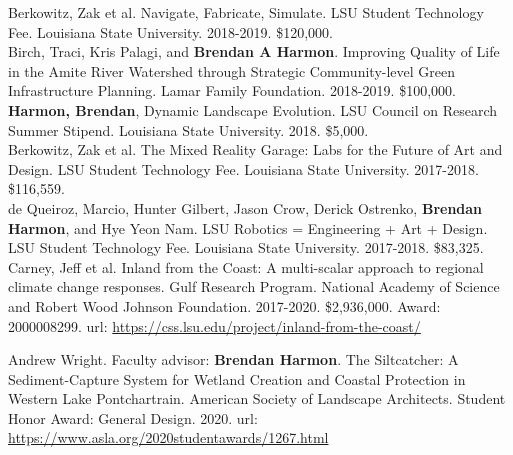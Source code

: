 \documentclass[10pt]{developercv} %
\begin{document}
Berkowitz, Zak et al. Navigate, Fabricate, Simulate. 
LSU Student Technology Fee. Louisiana State University. 
2018-2019.	\$120,000.\\

Birch, Traci, Kris Palagi, and \textbf{Brendan A Harmon}. 
Improving Quality of Life in the Amite River Watershed through Strategic Community-level Green Infrastructure Planning. 
Lamar Family Foundation. 
2018-2019. \$100,000.\\

\textbf{Harmon, Brendan}, 
Dynamic Landscape Evolution. 
LSU Council on Research Summer Stipend. Louisiana State University. 
2018. \$5,000.\\

Berkowitz, Zak et al. 
The Mixed Reality Garage: Labs for the Future of Art and Design. 
LSU Student Technology Fee. Louisiana State University. 
2017-2018. \$116,559.\\

de Queiroz, Marcio, Hunter Gilbert, Jason Crow, Derick Ostrenko, \textbf{Brendan Harmon}, and Hye Yeon Nam. 
LSU Robotics = Engineering + Art + Design. 
LSU Student Technology Fee. Louisiana State University. 
2017-2018. \$83,325.\\

Carney, Jeff et al. 
Inland from the Coast: A multi-scalar approach to regional climate change responses. 
Gulf Research Program. National Academy of Science and Robert Wood Johnson Foundation.
2017-2020. \$2,936,000. Award: 2000008299.
url: \url{https://css.lsu.edu/project/inland-from-the-coast/}\\






Andrew Wright. Faculty advisor: \textbf{Brendan Harmon}. The Siltcatcher: A Sediment-Capture System for Wetland Creation and Coastal Protection in Western Lake Pontchartrain. American Society of Landscape Architects. Student Honor Award: General Design. 2020. url: \url{https://www.asla.org/2020studentawards/1267.html}\\
\end{document}
